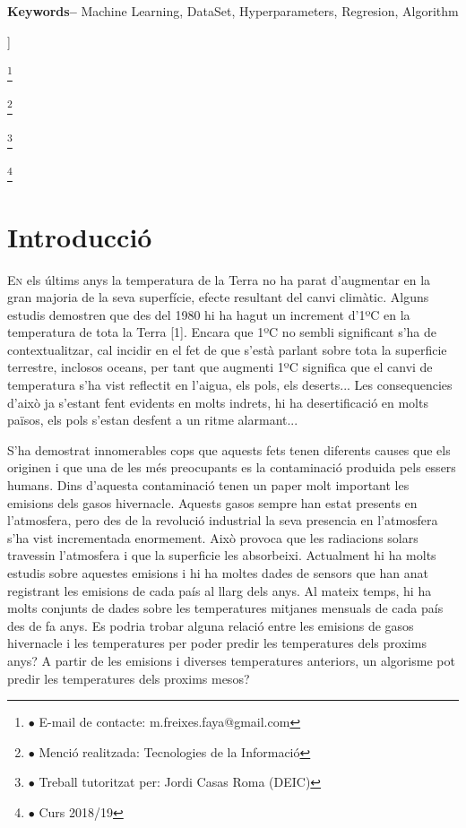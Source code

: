 \documentclass[10pt,a4paper,twocolumn,twoside]{article}
\newcommand\blfootnote[1]{%
  \begingroup
  \renewcommand\thefootnote{}\footnote{#1}%
  \addtocounter{footnote}{-1}%
  \endgroup
}
\begin{document}
\begin{@twocolumnfalse}
\begin{center}
{\\
\\
\textbf{Keywords-- } Machine Learning, DataSet, Hyperparameters, Regresion, Algorithm\\
}

\bigskip

{\vrule depth 0pt height 0.5pt width 4cm\hspace{7.5pt}%
%
\hspace{7.5pt}\vrule depth 0pt height 0.5pt width 4cm\relax}

\end{center}

\bigskip
\end{@twocolumnfalse}]

\blfootnote{$\bullet$ E-mail de contacte: m.freixes.faya@gmail.com}
\blfootnote{$\bullet$ Menció realitzada: Tecnologies de la Informació}
\blfootnote{$\bullet$ Treball tutoritzat per: Jordi Casas Roma (DEIC)}
\blfootnote{$\bullet$ Curs 2018/19}
\section{Introducció}
\lettrine[lines=3]{E}{n} els últims anys la temperatura de la Terra no ha parat d'augmentar en la gran majoria de la seva superfície, efecte resultant del canvi climàtic. Alguns estudis demostren que des del 1980 hi ha hagut un increment d'1ºC en la temperatura de tota la Terra [1]. Encara que 1ºC no sembli significant s'ha de contextualitzar, cal incidir en el fet de que s'està parlant sobre tota la superficie terrestre, inclosos oceans, per tant que augmenti 1ºC significa que el canvi de temperatura s'ha vist reflectit en l'aigua, els pols, els deserts... Les consequencies d'això ja s'estant fent evidents en molts indrets, hi ha desertificació en molts països, els pols s'estan desfent a un ritme alarmant... 

S'ha demostrat innomerables cops que aquests fets tenen diferents causes que els originen i que una de les més preocupants es la contaminació produida pels essers humans. Dins d'aquesta contaminació tenen un paper molt important les emisions dels gasos hivernacle. Aquests gasos sempre han estat presents en l'atmosfera, pero des de la revolució industrial la seva presencia en l'atmosfera s'ha vist incrementada enormement. Això provoca que les radiacions solars travessin l'atmosfera i que la superficie les absorbeixi. Actualment hi ha molts estudis sobre aquestes emisions i hi ha moltes dades de sensors que han anat registrant les emisions de cada país al llarg dels anys. Al mateix temps, hi ha molts conjunts de dades sobre les temperatures mitjanes mensuals de cada país des de fa anys. Es podria trobar alguna relació entre les emisions de gasos hivernacle i les temperatures per poder predir les temperatures dels proxims anys? A partir de les emisions i diverses temperatures anteriors, un algorisme pot predir les temperatures dels proxims mesos?
\end{document}
